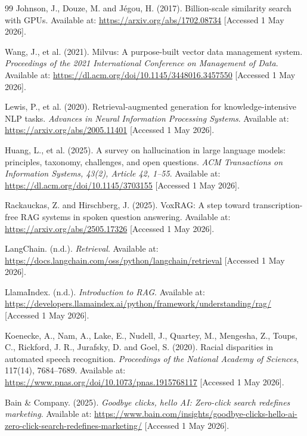 \documentclass[11pt,a4paper]{article}
\begin{document}
\begin{thebibliography}{99}
Johnson, J., Douze, M. and Jégou, H. (2017).
Billion-scale similarity search with GPUs.
Available at: \url{https://arxiv.org/abs/1702.08734}
[Accessed 1 May 2026].

Wang, J., et al. (2021).
Milvus: A purpose-built vector data management system.
\textit{Proceedings of the 2021 International Conference on Management of Data}.
Available at: \url{https://dl.acm.org/doi/10.1145/3448016.3457550}
[Accessed 1 May 2026].

Lewis, P., et al. (2020).
Retrieval-augmented generation for knowledge-intensive NLP tasks.
\textit{Advances in Neural Information Processing Systems}.
Available at: \url{https://arxiv.org/abs/2005.11401}
[Accessed 1 May 2026].

Huang, L., et al. (2025).
A survey on hallucination in large language models: principles, taxonomy, challenges, and open questions.
\textit{ACM Transactions on Information Systems, 43(2), Article 42, 1--55}.
Available at: \url{https://dl.acm.org/doi/10.1145/3703155}
[Accessed 1 May 2026].

Rackauckas, Z. and Hirschberg, J. (2025).
VoxRAG: A step toward transcription-free RAG systems in spoken question answering.
Available at: \url{https://arxiv.org/abs/2505.17326}
[Accessed 1 May 2026].

LangChain. (n.d.).
\textit{Retrieval}.
Available at: \url{https://docs.langchain.com/oss/python/langchain/retrieval}
[Accessed 1 May 2026].

LlamaIndex. (n.d.).
\textit{Introduction to RAG}.
Available at: \url{https://developers.llamaindex.ai/python/framework/understanding/rag/}
[Accessed 1 May 2026].


Koenecke, A., Nam, A., Lake, E., Nudell, J., Quartey, M., Mengesha, Z., Toups, C., Rickford, J. R., Jurafsky, D. and Goel, S. (2020).
Racial disparities in automated speech recognition.
\textit{Proceedings of the National Academy of Sciences}, 117(14), 7684--7689.
Available at: \url{https://www.pnas.org/doi/10.1073/pnas.1915768117}
[Accessed 1 May 2026].

Bain \& Company. (2025).
\textit{Goodbye clicks, hello AI: Zero-click search redefines marketing}.
Available at: \url{https://www.bain.com/insights/goodbye-clicks-hello-ai-zero-click-search-redefines-marketing/}
[Accessed 1 May 2026].


\end{thebibliography}
\end{document}

